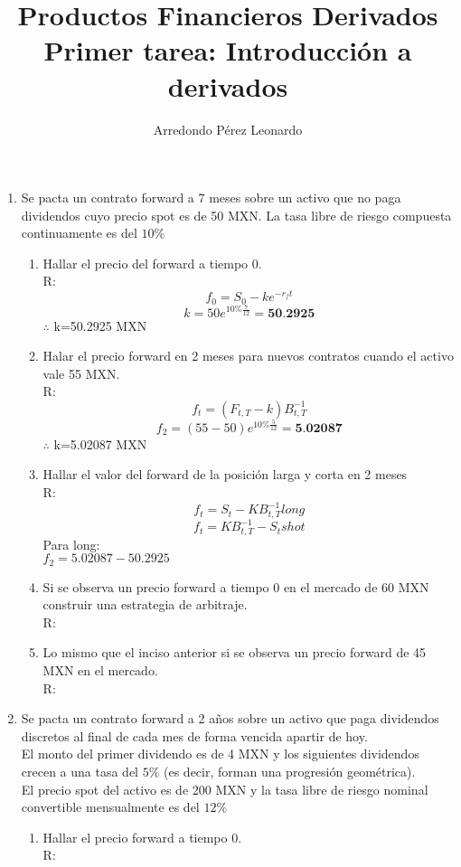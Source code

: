\documentclass[12pt,a4paper]{article}
\author{Arredondo Pérez Leonardo}
\title{Productos Financieros Derivados \\
Primer tarea: Introducción a derivados}
\begin{document}
 \maketitle
\newpage
\begin{enumerate}
\item Se pacta un contrato forward a 7 meses sobre un activo que no paga dividendos cuyo precio spot es de 50 MXN. La tasa libre de riesgo compuesta continuamente es del $10\%$\\
	\begin{enumerate}
	 \item Hallar el precio del forward a tiempo 0.\\
	 \textcolor{borungy}{R:}\\
	$$f_{0}=S_{0}-ke^{-r_{f}t}$$
	 $$k=50e^{10\%\frac{7}{12}}=\textbf{50.2925}$$
    $\therefore$ k=50.2925 MXN
	 
	 \item Halar el precio forward en 2 meses para nuevos contratos cuando el activo vale 55 MXN.\\
	 \textcolor{borungy}{R:}\\
	 $$f_{t}=(F_{t,T}-k)B_{t,T}^{-1}$$
	 $$f_{2}=(55-50)e^{10\%\frac{5}{12}}=\textbf{5.02087}$$
	 $\therefore$ k=5.02087 MXN
	 \item Hallar el valor del forward de la posición larga y corta en 2 meses\\
	 \textcolor{borungy}{R:}\\
	 
	 $$f_{t}=S_{t}-KB_{t,T}^{-1} long$$
	$$f_{t}=KB_{t,T}^{-1}-S_{t}  shot$$
	Para long:\\
	 $f_{2}=5.02087-50.2925$


	\item Si se observa un precio forward a tiempo 0 en el mercado de 60 MXN construir una estrategia
de arbitraje.\\
	 \textcolor{borungy}{R:}\\

	\item Lo mismo que el inciso anterior si se observa  un precio forward de 45 MXN en el mercado.\\
	\textcolor{borungy}{R:}\\

    \end{enumerate}
\item Se pacta un contrato forward a 2 años sobre un activo que paga dividendos discretos
al final de cada mes de forma vencida apartir de hoy.\\
El monto del primer dividendo es de 4 MXN y los siguientes dividendos crecen a una
tasa del $5\%$ (es decir, forman una progresión geométrica).\\
El precio spot del activo es de 200 MXN
y la tasa libre de riesgo nominal convertible
mensualmente es del $12\%$    
   \begin{enumerate}
   \item Hallar el precio forward a tiempo 0.\\
   	\textcolor{borungy}{R:}\\


\end{enumerate}
\end{enumerate}
\end{document}
